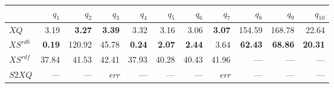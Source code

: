 \begin{tabular}{lrrrrrrrrrr}
\toprule
  & $q_{1}$ & $q_{2}$ & $q_{3}$ & $q_{4}$ & $q_{5}$ & $q_{6}$ & $q_{7}$ & $q_{8}$ & $q_{9}$ & $q_{10}$ \\
\midrule
$\mathit{XQ}$        & 3.19   & \textbf{3.27}  & \textbf{3.39}  & 3.32   & 3.16   & 3.06   & \textbf{3.07}  & 154.59   & 168.78   & 22.64   \\[0.15em]
$\mathit{XS^{rdb}}$  & \textbf{0.19}   & 120.92   & 45.78   & \textbf{0.24}  & \textbf{2.07}   & \textbf{2.44}   & 3.64   & \textbf{62.43}   & \textbf{68.86}  & \textbf{20.31}  \\[0.15em]
$\mathit{XS^{rdf}}$  & 37.84   & 41.53   & 42.41   & 37.93   & 40.28   & 40.43   & 41.96   &  --- &  --- &  --- \\[0.15em]
$\mathit{S2XQ}$      &  --- &  --- & \textit{err} &  --- &  --- &  --- & \textit{err} &  --- &  --- &  --- \\[0.15em]
\bottomrule
\end{tabular}
